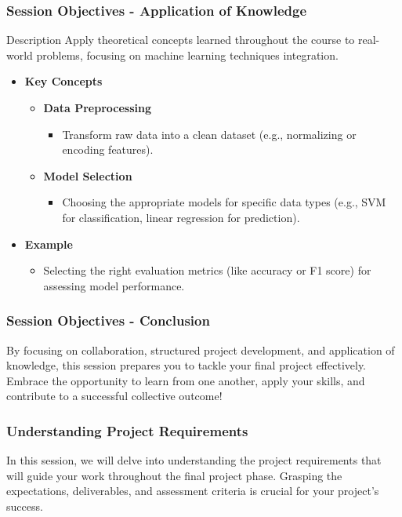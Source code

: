 \documentclass[aspectratio=169]{beamer}
\begin{document}
\begin{frame}[fragile]
    \frametitle{Session Objectives - Application of Knowledge}
    \begin{block}{Description}
        Apply theoretical concepts learned throughout the course to real-world problems, focusing on machine learning techniques integration.
    \end{block}
    \begin{itemize}
        \item \textbf{Key Concepts}
            \begin{itemize}
                \item \textbf{Data Preprocessing}
                    \begin{itemize}
                        \item Transform raw data into a clean dataset (e.g., normalizing or encoding features).
                    \end{itemize}
                \item \textbf{Model Selection}
                    \begin{itemize}
                        \item Choosing the appropriate models for specific data types (e.g., SVM for classification, linear regression for prediction).
                    \end{itemize}
            \end{itemize}
        \item \textbf{Example}
            \begin{itemize}
                \item Selecting the right evaluation metrics (like accuracy or F1 score) for assessing model performance.
            \end{itemize}
    \end{itemize}
\end{frame}

\begin{frame}[fragile]
    \frametitle{Session Objectives - Conclusion}
    By focusing on collaboration, structured project development, and application of knowledge, this session prepares you to tackle your final project effectively. Embrace the opportunity to learn from one another, apply your skills, and contribute to a successful collective outcome!
\end{frame}

\begin{frame}[fragile]
    \frametitle{Understanding Project Requirements}
    In this session, we will delve into understanding the project requirements that will guide your work throughout the final project phase. 
    Grasping the expectations, deliverables, and assessment criteria is crucial for your project's success.
\end{frame}
\end{document}
